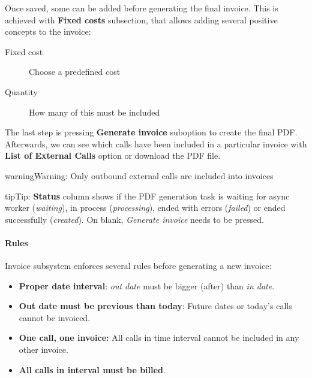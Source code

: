 \documentclass[letterpaper,10pt,english]{sphinxmanual}
\begin{document}
Once saved, some {\hyperref[administration_portal/brand/invoicing/fixed_costs:fixed\string-costs]{}} can be added before generating the final invoice. This is achieved with \textbf{Fixed costs}
subsection, that allows adding several positive concepts to the invoice:
\begin{description}
\item[{Fixed cost}] \leavevmode{}\label{administration_portal/brand/invoicing/invoices:term-fixed-cost}
Choose a predefined cost

\item[{Quantity}] \leavevmode{}\label{administration_portal/brand/invoicing/invoices:term-quantity}
How many of this must be included

\end{description}

The last step is pressing \textbf{Generate invoice} suboption to create the final PDF. Afterwards, we can see which calls have been
included in a particular invoice with \textbf{List of External Calls} option or download the PDF file.

\begin{notice}{warning}{Warning:}
Only outbound external calls are included into invoices
\end{notice}

\begin{notice}{tip}{Tip:}
\textbf{Status} column shows if the PDF generation task is waiting for async worker (\emph{waiting}), in process (\emph{processing}),
ended with errors (\emph{failed}) or ended successfully (\emph{created}). On blank, \emph{Generate invoice} needs to be pressed.
\end{notice}


\paragraph{Rules}
\label{administration_portal/brand/invoicing/invoices:rules}
Invoice subsystem enforces several rules before generating a new invoice:
\begin{itemize}
\item {} 
\textbf{Proper date interval}: \emph{out date} must be bigger (after) than \emph{in date}.

\item {} 
\textbf{Out date must be previous than today}: Future dates or today's calls cannot be invoiced.

\item {} 
\textbf{One call, one invoice:} All calls in time interval cannot be included in any other invoice.

\item {} 
\textbf{All calls in interval must be billed}.

\end{itemize}
\end{document}
